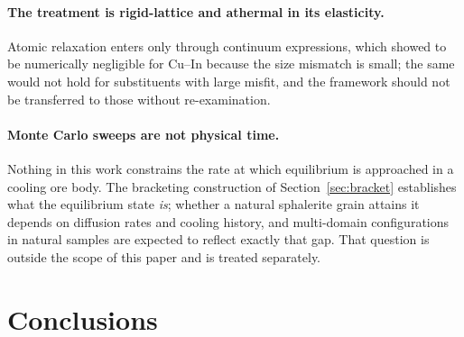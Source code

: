 \documentclass[11pt,a4paper]{article}
\begin{document}
\paragraph{The treatment is rigid-lattice and athermal in its elasticity.}
Atomic relaxation enters only through continuum expressions, which
\citet{yu2026} showed to be numerically negligible for Cu--In because the size
mismatch is small; the same would not hold for substituents with large misfit,
and the framework should not be transferred to those without re-examination.

\paragraph{Monte Carlo sweeps are not physical time.} Nothing in this work
constrains the rate at which equilibrium is approached in a cooling ore body.
The bracketing construction of Section~\ref{sec:bracket} establishes what the
equilibrium state \emph{is}; whether a natural sphalerite grain attains it
depends on diffusion rates and cooling history, and multi-domain configurations
in natural samples are expected to reflect exactly that gap. That question is
outside the scope of this paper and is treated separately.

\section{Conclusions}
\label{sec:conclusions}
\end{document}
